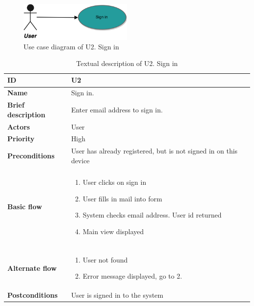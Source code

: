 \begin{figure}[hp]
	\includegraphics[width=0.5\textwidth]{fig/U2}
	\centering
	\caption{Use case diagram of U2. Sign in}
	\label{Fig:U2}
\end{figure}

\begin{table}[hp]
	\renewcommand{\arraystretch}{1.5}
	\centering
	\caption{Textual description of U2. Sign in}
	\begin{tabular}[b]{|l | l|}\hline
		\textbf{ID} 				& U2									\\\hline
		\textbf{Name} 				& Sign in.								\\\hline
		\textbf{Brief description}	& Enter email address to sign in. 		\\\hline
		\textbf{Actors} 			& User									\\\hline
		\textbf{Priority}			& High									\\\hline
		\textbf{Preconditions}		& User has already registered, but is not signed in on this device			\\\hline&\\[-2ex]
		\textbf{Basic flow}			& \begin{minipage}{5in}
			\begin{enumerate}[noitemsep]
				\item User clicks on sign in
				\item User fills in mail into form
				\item System checks email address. User id returned
				\item Main view displayed
			\end{enumerate}						
		\end{minipage}						\\\hline&\\[-2ex]
		\textbf{Alternate flow}		& \begin{minipage}{5in}
			\begin{enumerate}[noitemsep]
				\item User not found
				\item Error message displayed, go to 2.
			\end{enumerate}
		\end{minipage}							\\\hline
		\textbf{Postconditions}		& User is signed in to the system\\\hline
	\end{tabular}
	\label{Tab:U2}
\end{table}

